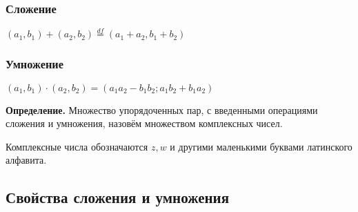 \documentclass{article}
\begin{document}
    \subsubsection{Сложение}

    \( (a_1, b_1) + (a_2, b_2) \stackrel{df}{=} (a_1 + a_2, b_1 + b_2) \)

    \subsubsection{Умножение}

    \( (a_1, b_1) \cdot (a_2, b_2) = (a_1a_2-b_1b_2; a_1b_2 + b_1a_2)\)

    \textbf{Определение.} Множество упорядоченных пар, с введенными операциями сложения и умножения, назовём множеством комплексных чисел.

    Комплексные числа обозначаются \( z, w \) и другими маленькими буквами латинского алфавита.

    \subsection{Свойства сложения и умножения}
\end{document}
